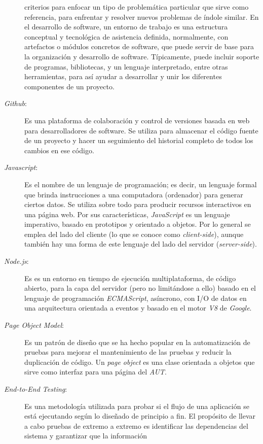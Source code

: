 \begin{description}
    criterios para enfocar un tipo de problemática particular que sirve como
    referencia, para enfrentar y resolver nuevos problemas de índole similar. En
    el desarrollo de software, un entorno de trabajo es una estructura
    conceptual y tecnológica de asistencia definida, normalmente, con artefactos
    o módulos concretos de software, que puede servir de base para la
    organización y desarrollo de software. Típicamente, puede incluir soporte de
    programas, bibliotecas, y un lenguaje interpretado, entre otras
    herramientas, para así ayudar a desarrollar y unir los diferentes
    componentes de un proyecto.
\item [\emph{Github}:] Es una plataforma de colaboración y control de versiones
    basada en web para desarrolladores de software. Se utiliza para almacenar el
    código fuente de un proyecto y hacer un seguimiento del historial completo
    de todos los cambios en ese código.
\item [\emph{Javascript}:] Es el nombre de un lenguaje de programación; es
    decir, un lenguaje formal que brinda instrucciones a una computadora
    (ordenador) para generar ciertos datos. Se utiliza sobre todo para producir
    recursos interactivos en una página web. Por sus características,
    \emph{JavaScript} es un lenguaje imperativo, basado en prototipos y
    orientado a objetos. Por lo general se emplea del lado del cliente (lo que
    se conoce como \emph{client-side}), aunque también hay una forma de este
    lenguaje del lado del servidor (\emph{server-side}).
\item [\emph{Node.js}:] Es es un entorno en tiempo de ejecución multiplataforma,
    de código abierto, para la capa del servidor (pero no limitándose a ello)
    basado en el lenguaje de programación \emph{ECMAScript}, asíncrono, con I/O
    de datos en una arquitectura orientada a eventos y basado en el motor
    \emph{V8} de \emph{Google}.
\item [\emph{Page Object Model}:] Es un patrón de diseño que se ha hecho popular
    en la automatización de pruebas para mejorar el mantenimiento de las pruebas
    y reducir la duplicación de código. Un \emph{page object} es una clase
    orientada a objetos que sirve como interfaz para una página del \emph{AUT}.
\item [\emph{End-to-End Testing}:] Es una metodología utilizada para probar si
    el flujo de una aplicación se está ejecutando según lo diseñado de principio
    a fin. El propósito de llevar a cabo pruebas de extremo a extremo es
    identificar las dependencias del sistema y garantizar que la información

\end{description}
